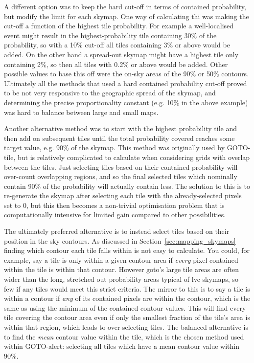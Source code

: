 \begin{colsection}
\begin{colsection}
A different option was to keep the hard cut-off in terms of contained probability, but modify the limit for each skymap. One way of calculating thi was making the cut-off a function of the highest tile probability. For example a well-localised event might result in the highest-probability tile containing $30\%$ of the probability, so with a 10\% cut-off all tiles containing 3\% or above would be added. On the other hand a spread-out skymap might have a highest tile only containing 2\%, so then all tiles with 0.2\% or above would be added. Other possible values to base this off were the on-sky areas of the 90\% or 50\% contours. Ultimately all the methods that used a hard contained probability cut-off proved to be not very responsive to the geographic spread of the skymap, and determining the precise proportionality constant (e.g. 10\% in the above example) was hard to balance between large and small maps.

Another alternative method was to start with the highest probability tile and then add on subsequent tiles until the total probability covered reaches some target value, e.g. 90\% of the skymap. This method was originally used by GOTO-tile, but is relatively complicated to calculate when considering grids with overlap between the tiles. Just selecting tiles based on their contained probability will over-count overlapping regions, and so the final selected tiles which nominally contain 90\% of the probability will actually contain less. The solution to this is to re-generate the skymap after selecting each tile with the already-selected pixels set to 0, but this then becomes a non-trivial optimisation problem that is computationally intensive for limited gain compared to other possibilities.

The ultimately preferred alternative is to instead select tiles based on their position in the sky contours. As discussed in Section~\ref{sec:mapping_skymaps} finding which contour each tile falls within is not easy to calculate. You could, for example, say a tile is only within a given contour area if \textit{every} pixel contained within the tile is within that contour. However \gls{goto}'s large tile areas are often wider than the long, stretched out probability areas typical of \gls{lvc} skymaps, so few if any tiles would meet this strict criteria. The mirror to this is to say a tile is within a contour if \textit{any} of its contained pixels are within the contour, which is the same as using the minimum of the contained contour values. This will find every tile covering the contour area even if only the smallest fraction of the tile's area is within that region, which leads to over-selecting tiles. The balanced alternative is to find the \textit{mean} contour value within the tile, which is the chosen method used within GOTO-alert: selecting all tiles which have a mean contour value within 90\%.


\end{colsection}
\end{colsection}

